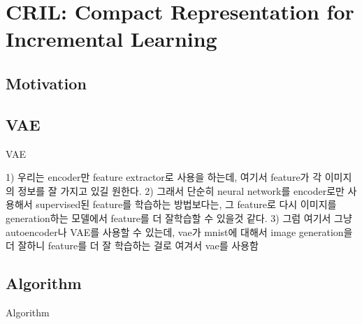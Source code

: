
\section{CRIL: Compact Representation for Incremental Learning}
\label{sec:cril}

\subsection{Motivation}
\label{sec:motivation}


\subsection{VAE}
\label{sec:vae}
VAE

1) 우리는 encoder만 feature extractor로 사용을 하는데, 여기서 feature가 각 이미지의 정보를 잘 가지고 있길 원한다.
2) 그래서 단순히 neural network를 encoder로만 사용해서 supervised된 feature를 학습하는 방법보다는, 그 feature로 다시 이미지를 generation하는 모델에서 feature를 더 잘학습할 수 있을것 같다.
3) 그럼 여기서 그냥 autoencoder나 VAE를 사용할 수 있는데, vae가 mnist에 대해서 image generation을 더 잘하니 feature를 더 잘 학습하는 걸로 여겨서 vae를 사용함

\subsection{Algorithm} %
\label{sec:algorithm}
Algorithm
